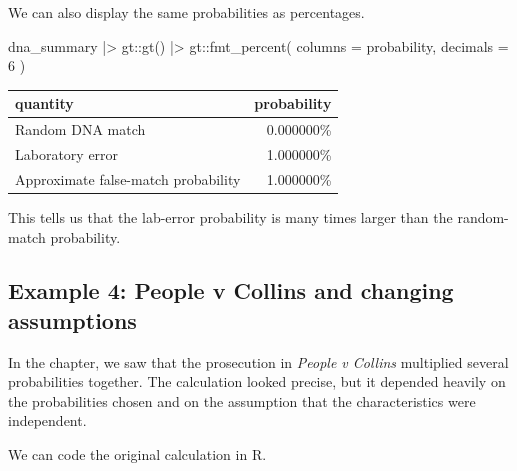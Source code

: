 \documentclass[
  letterpaper,
  DIV=11,
  numbers=noendperiod]{scrreprt}
\newenvironment{Shaded}{\begin{snugshade}}{\end{snugshade}}
\newcommand{\AttributeTok}[1]{\textcolor[rgb]{0.40,0.45,0.13}{#1}}
\newcommand{\DecValTok}[1]{\textcolor[rgb]{0.68,0.00,0.00}{#1}}
\newcommand{\FunctionTok}[1]{\textcolor[rgb]{0.28,0.35,0.67}{#1}}
\newcommand{\NormalTok}[1]{\textcolor[rgb]{0.00,0.23,0.31}{#1}}
\newcommand{\SpecialCharTok}[1]{\textcolor[rgb]{0.37,0.37,0.37}{#1}}
\begin{document}
We can also display the same probabilities as percentages.

\begin{Shaded}
\begin{Highlighting}[]
\NormalTok{dna\_summary }\SpecialCharTok{|\textgreater{}}
\NormalTok{  gt}\SpecialCharTok{::}\FunctionTok{gt}\NormalTok{() }\SpecialCharTok{|\textgreater{}}
\NormalTok{  gt}\SpecialCharTok{::}\FunctionTok{fmt\_percent}\NormalTok{(}
    \AttributeTok{columns =}\NormalTok{ probability,}
    \AttributeTok{decimals =} \DecValTok{6}
\NormalTok{  )}
\end{Highlighting}
\end{Shaded}

\begin{table}
\fontsize{12.0pt}{14.0pt}\selectfont
\begin{tabular*}{\linewidth}{@{\extracolsep{\fill}}lr}
\toprule
quantity & probability \\ 
\midrule\addlinespace[2.5pt]
Random DNA match & 0.000000\% \\ 
Laboratory error & 1.000000\% \\ 
Approximate false-match probability & 1.000000\% \\ 
\bottomrule
\end{tabular*}
\end{table}

This tells us that the lab-error probability is many times larger than
the random-match probability.

\subsection{Example 4: People v Collins and changing
assumptions}\label{example-4-people-v-collins-and-changing-assumptions}

In the chapter, we saw that the prosecution in \emph{People v Collins}
multiplied several probabilities together. The calculation looked
precise, but it depended heavily on the probabilities chosen and on the
assumption that the characteristics were independent.

We can code the original calculation in R.
\end{document}
